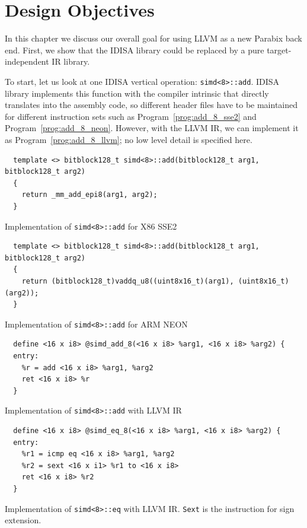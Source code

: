 \chapter{Design Objectives}
\label{three}

In this chapter we discuss our overall goal for using LLVM as a new Parabix back end. First, we show that the IDISA library could be replaced by a pure target-independent IR library.

To start, let us look at one IDISA vertical operation: {\tt simd<8>::add}. IDISA library implements this function with the compiler intrinsic that directly translates into the assembly code, so different header files have to be maintained for different instruction sets such as Program~\ref{prog:add_8_sse2} and Program~\ref{prog:add_8_neon}. However, with the LLVM IR, we can implement it as Program~\ref{prog:add_8_llvm}; no low level detail is specified here.

\begin{program}
\begin{verbatim}
  template <> bitblock128_t simd<8>::add(bitblock128_t arg1, bitblock128_t arg2)
  {
    return _mm_add_epi8(arg1, arg2);
  }
\end{verbatim}
\caption{Implementation of {\tt simd<8>::add} for X86 SSE2}
\label{prog:add_8_sse2}
\end{program}

\begin{program}
\begin{verbatim}
  template <> bitblock128_t simd<8>::add(bitblock128_t arg1, bitblock128_t arg2)
  {
    return (bitblock128_t)vaddq_u8((uint8x16_t)(arg1), (uint8x16_t)(arg2));
  }
\end{verbatim}
\caption{Implementation of {\tt simd<8>::add} for ARM NEON}
\label{prog:add_8_neon}
\end{program}

\begin{program}
\begin{verbatim}
  define <16 x i8> @simd_add_8(<16 x i8> %arg1, <16 x i8> %arg2) {
  entry:
    %r = add <16 x i8> %arg1, %arg2
    ret <16 x i8> %r
  }
\end{verbatim}
\caption{Implementation of {\tt simd<8>::add} with LLVM IR}
\label{prog:add_8_llvm}
\end{program}

\begin{program}
\begin{verbatim}
  define <16 x i8> @simd_eq_8(<16 x i8> %arg1, <16 x i8> %arg2) {
  entry:
    %r1 = icmp eq <16 x i8> %arg1, %arg2
    %r2 = sext <16 x i1> %r1 to <16 x i8>
    ret <16 x i8> %r2
  }
\end{verbatim}
\caption[Implementation of {\tt simd<8>::eq} with LLVM IR]{Implementation of {\tt simd<8>::eq} with LLVM IR. {\tt Sext} is the instruction for sign extension.}
\label{prog:icmp}
\end{program}

